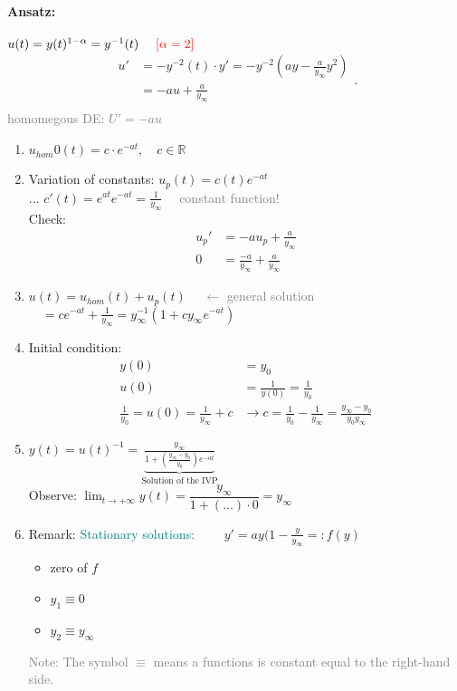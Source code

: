 \documentclass[]{article}
\begin{document}
	\paragraph{Ansatz:} $u(t)=y(t) ^{1-\alpha}=y ^{-1}(t)\quad \text{ \textcolor{red}{$[\alpha = 2]$}}$\[
	\begin{split}
		u' &=-y ^{-2}(t) \cdot y'=-y ^{-2}(ay- \frac{a}{y_\infty}y ^{2})\\
		   &=-au+ \frac{a}{y_\infty}\\
	\end{split}
	.\]
	\textcolor{gray}{homomegous DE: $U'=-au$}
	\begin{enumerate}
		\item $u_{hom}0(t)=c \cdot e ^{-at},\quad c\in \mathbb R $
		\item Variation of constants: $u_p(t)=c(t) e ^{-at}$\\
			... $c'(t)=e ^{at}e ^{-at}= \frac{1}{y_\infty}\quad$ \textcolor{gray}{constant function!}\\
			Check: \[
				\begin{split}
					u_p' &=-au_p+ \frac{a}{y_\infty}\\
					0 &= \frac{-a}{y_\infty}+ \frac{a}{y_\infty}
				\end{split}
			\]
		\item $u(t)=u_{hom}(t)+u_p(t)\quad$ \textcolor{gray}{$\longleftarrow$ general solution}\\
			$\quad=c e ^{-at} + \frac{1}{y_\infty}=y_\infty ^{-1}(1+cy_\infty e ^{-at})$
		\item Initial condition:
			\[
			\begin{split}
				y(0) &= y_0\\
				u(0) &= \frac{1}{y(0)}= \frac{1}{y_0}\\
				\frac{1}{y_0}= u(0)= \frac{1}{y_\infty}+c &\rightarrow c= \frac{1}{y_0}- \frac{1}{y_\infty}= \frac{y_\infty -y_0}{y_0y_\infty}
			\end{split}
			\]
		\item $y(t)=u(t) ^{-1}= \underbrace{\frac{y_\infty}{1+( \frac{y_\infty - y_0}{y_0}) e ^{-at}}}_ \text{Solution of the IVP}$\\
		Observe: $ \lim_{t\to+\infty} y(t)= \dfrac{y_\infty}{1+(...) \cdot 0}=y_\infty $
	\item Remark: \textcolor{teal}{Stationary solutions:} $\quad\quad y'=ay(1- \frac{y}{y_\infty}=:f(y)$
		\begin{itemize}
			\item zero of $f$
			\item $y_1\equiv 0$
			\item $y_2\equiv y_\infty$
		\end{itemize}
		\textcolor{gray}{Note: The symbol $\equiv$ means a functions is constant equal to the right-hand side.}
	\end{enumerate}
\end{document}
